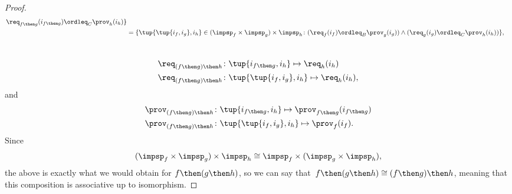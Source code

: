 {\begin{proof}
\begin{equation}
\begin{aligned}
                \req_{f\then g}(i_{f\then g}) \ordleq_{C} \prov_h(i_h)
                \}\\
                &=\{
                \tup{\tup{i_f, i_g},i_h} \in (\impsp_f \times \impsp_g) \times \impsp_{h}\colon
                (\req_f(i_f) \ordleq_{B} \prov_g(i_g))
                \wedge
                (\req_g(i_g) \ordleq_{C} \prov_h(i_h))
                \},
            \end{aligned}
        \end{equation}
        ~
        \begin{equation}
            \begin{aligned}
                \req_{(f\then g)\then h}  &\colon  \tup{i_{f\then g},i_h} \mapsto \req_h(i_h) \\
                \req_{(f\then g)\then h}  &\colon  \tup{\tup{i_f, i_g},i_h} \mapsto \req_h(i_h),
            \end{aligned}
        \end{equation}
        and
        \begin{equation}
            \begin{aligned}
                \prov_{(f\then g)\then h}  &\colon  \tup{i_{f\then g},i_h} \mapsto \prov_{f\then g}(i_{f\then g})\\
                \prov_{(f\then g)\then h}  &\colon  \tup{\tup{i_f, i_g},i_h} \mapsto \prov_f(i_f).
            \end{aligned}
        \end{equation}
        Since
        \begin{equation}
        (\impsp_f \times \impsp_g)
            \times \impsp_{h} \cong  \impsp_f \times (\impsp_g \times \impsp_{h}),
        \end{equation}
        the above is exactly what we would obtain for $f\then (g\then h)$, so we can say
        that~$f\then(g\then h)\cong (f\then g)\then h$, meaning that this composition is associative up to isomorphism.
    \end{proof}

}
